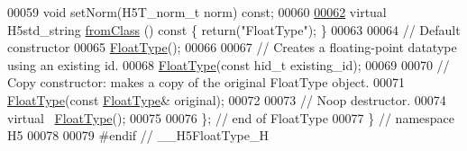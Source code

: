 \begin{DoxyCode}
00059         \textcolor{keywordtype}{void} setNorm(H5T\_norm\_t norm) \textcolor{keyword}{const};
00060 
\hyperlink{class_h5_1_1_float_type_a5977cef7ad7a91fa7b922672cab515f7}{00062}         \textcolor{keyword}{virtual} H5std\_string \hyperlink{class_h5_1_1_float_type_a5977cef7ad7a91fa7b922672cab515f7}{fromClass} ()\textcolor{keyword}{ const }\{ \textcolor{keywordflow}{return}(\textcolor{stringliteral}{"FloatType"}); \}
00063 
00064         \textcolor{comment}{// Default constructor}
00065         \hyperlink{class_h5_1_1_float_type}{FloatType}();
00066 
00067         \textcolor{comment}{// Creates a floating-point datatype using an existing id.}
00068         \hyperlink{class_h5_1_1_float_type}{FloatType}(\textcolor{keyword}{const} hid\_t existing\_id);
00069 
00070         \textcolor{comment}{// Copy constructor: makes a copy of the original FloatType object.}
00071         \hyperlink{class_h5_1_1_float_type}{FloatType}(\textcolor{keyword}{const} \hyperlink{class_h5_1_1_float_type}{FloatType}& original);
00072 
00073         \textcolor{comment}{// Noop destructor.}
00074         \textcolor{keyword}{virtual} ~\hyperlink{class_h5_1_1_float_type}{FloatType}();
00075 
00076 \}; \textcolor{comment}{// end of FloatType}
00077 \} \textcolor{comment}{// namespace H5}
00078 
00079 \textcolor{preprocessor}{#endif // \_\_H5FloatType\_H}
\end{DoxyCode}
